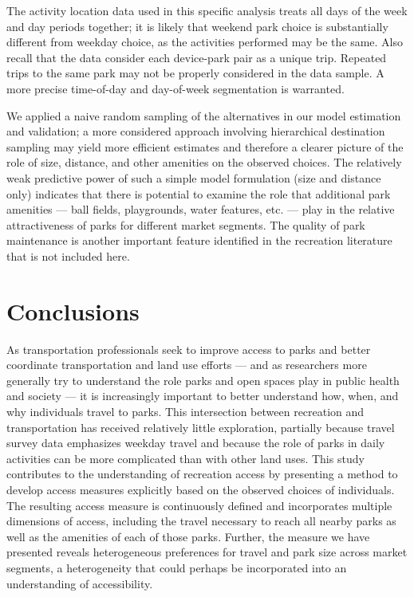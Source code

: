 \documentclass[]{elsarticle} %
\begin{document}
The activity location data used in this specific analysis treats all days of the
week and day periods together; it is likely that weekend park choice is
substantially different from weekday choice, as the activities performed may be
the same. Also recall that the data consider each device-park pair as a unique
trip. Repeated trips to the same park may not be properly considered in the data
sample. A more precise time-of-day and day-of-week segmentation is warranted.

We applied a naive random sampling of the alternatives in our model estimation
and validation; a more considered approach involving hierarchical destination
sampling may yield more efficient estimates and therefore a clearer picture of
the role of size, distance, and other amenities on the observed choices. The
relatively weak predictive power of such a simple model formulation (size and
distance only) indicates that there is potential to examine the role that
additional park amenities --- ball fields, playgrounds, water features, etc. ---
play in the relative attractiveness of parks for different market segments. The
quality of park maintenance is another important feature identified in the
recreation literature \citep{Fletcher2003} that is not included here.

\hypertarget{conclusions}{%
\section{Conclusions}\label{conclusions}}

As transportation professionals seek to improve access to parks and better
coordinate transportation and land use efforts --- and as researchers more
generally try to understand the role parks and open spaces play in public health
and society --- it is increasingly important to better understand how, when, and
why individuals travel to parks. This intersection between recreation and
transportation has received relatively little exploration, partially because
travel survey data emphasizes weekday travel and because the role of parks in
daily activities can be more complicated than with other land uses. This study
contributes to the understanding of recreation access by presenting a method to
develop access measures explicitly based on the observed choices of individuals.
The resulting access measure is continuously defined and incorporates multiple
dimensions of access, including the travel necessary to reach all nearby parks
as well as the amenities of each of those parks. Further, the measure we have
presented reveals heterogeneous preferences for travel and park size across
market segments, a heterogeneity that could perhaps be incorporated into an
understanding of accessibility.
\end{document}
